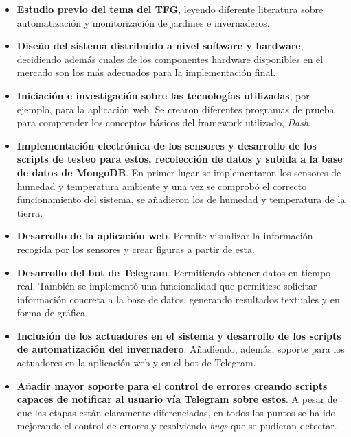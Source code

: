 \documentclass[a4paper, 12pt, oneside]{book}
\begin{document}
\begin{itemize}
\item \textbf{Estudio previo del tema del TFG}, leyendo diferente literatura sobre automatización y monitorización de jardines e invernaderos.

\item \textbf{Diseño del sistema distribuido a nivel software y hardware}, decidiendo además cuales de los componentes hardware disponibles en el mercado son los más adecuados para la implementación final.

\item \textbf{Iniciación e investigación sobre las tecnologías utilizadas}, por ejemplo, para la aplicación web. Se crearon diferentes programas de prueba para comprender los conceptos básicos del framework utilizado, \textit{Dash}.

\item \textbf{Implementación electrónica de los sensores y desarrollo de los scripts de testeo para estos, recolección de datos y subida a la base de datos de MongoDB}. En primer lugar se implementaron los sensores de humedad y temperatura ambiente y una vez se comprobó el correcto funcionamiento del sistema, se añadieron los de humedad y temperatura de la tierra.

\item \textbf{Desarrollo de la aplicación web}. Permite visualizar la información recogida por los sensores y crear figuras a partir de esta.

\item \textbf{Desarrollo del bot de Telegram}. Permitiendo obtener datos en tiempo real. También se implementó una funcionalidad que permitiese solicitar información concreta a la base de datos, generando resultados textuales y en forma de gráfica.

\item \textbf{Inclusión de los actuadores en el sistema y desarrollo de los scripts de automatización del invernadero}. Añadiendo, además, soporte para los actuadores en la aplicación web y en el bot de Telegram.

\item \textbf{Añadir mayor soporte para el control de errores creando scripts capaces de notificar al usuario vía Telegram sobre estos}. A pesar de que las etapas están claramente diferenciadas, en todos los puntos se ha ido mejorando el control de errores y resolviendo \textit{bugs} que se pudieran detectar. 

\end{itemize}
  
\end{document}
